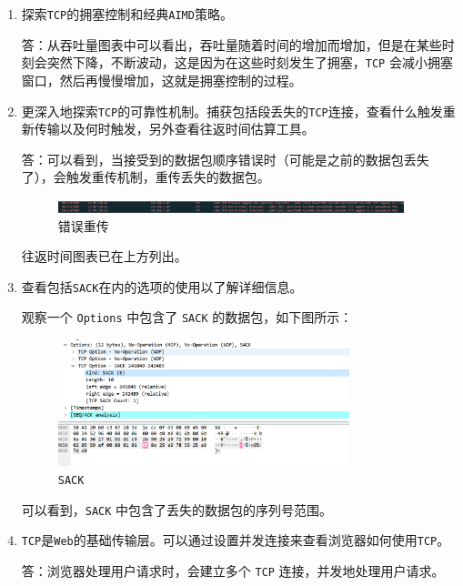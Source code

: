 \documentclass{article}
\begin{document}
\begin{enumerate}
  \item 探索\texttt{TCP}的拥塞控制和经典\texttt{AIMD}策略。
        
  答：从吞吐量图表中可以看出，吞吐量随着时间的增加而增加，但是在某些时刻会突然下降，不断波动，这是因为在这些时刻发生了拥塞，\texttt{TCP} 会减小拥塞窗口，然后再慢慢增加，这就是拥塞控制的过程。
  
  \item 更深入地探索\texttt{TCP}的可靠性机制。捕获包括段丢失的\texttt{TCP}连接，查看什么触发重新传输以及何时触发，另外查看往返时间估算工具。

  答：可以看到，当接受到的数据包顺序错误时（可能是之前的数据包丢失了），会触发重传机制，重传丢失的数据包。

  \begin{figure}[H]
    \centering
    \includegraphics[width=0.95\textwidth]{img/15.png}
    \caption{错误重传}
  \end{figure}

  往返时间图表已在上方列出。
  
  \item 查看包括\texttt{SACK}在内的选项的使用以了解详细信息。

  观察一个 \texttt{Options} 中包含了 \texttt{SACK} 的数据包，如下图所示：

  \begin{figure}[H]
    \centering
    \includegraphics[width=0.8\textwidth]{img/16.png}
    \caption{\texttt{SACK}}
  \end{figure}

  可以看到，\texttt{SACK} 中包含了丢失的数据包的序列号范围。
  
  \item \texttt{TCP}是\texttt{Web}的基础传输层。可以通过设置并发连接来查看浏览器如何使用\texttt{TCP}。

  答：浏览器处理用户请求时，会建立多个 \texttt{TCP} 连接，并发地处理用户请求。

\end{enumerate}
\end{document}
